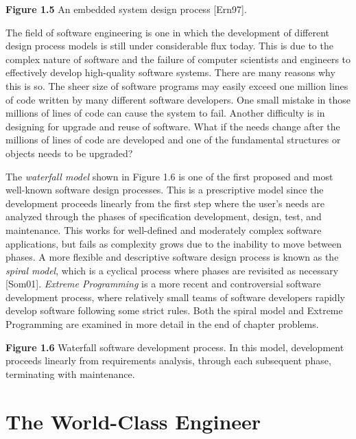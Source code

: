 \documentclass[a4paper,10pt]{book}
\begin{document}

\textbf{Figure 1.5} An embedded system design process {[}Ern97{]}.

The field of software engineering is one in which the development of
different design process models is still under considerable flux today.
This is due to the complex nature of software and the failure of
computer scientists and engineers to effectively develop high-quality
software systems. There are many reasons why this is so. The sheer size
of software programs may easily exceed one million lines of code written
by many different software developers. One small mistake in those
millions of lines of code can cause the system to fail. Another
difficulty is in designing for upgrade and reuse of software. What if
the needs change after the millions of lines of code are developed and
one of the fundamental structures or objects needs to be upgraded?

The \emph{waterfall model} shown in Figure 1.6 is one of the first
proposed and most well-known software design processes. This is a
prescriptive model since the development proceeds linearly from the
first step where the user's needs are analyzed through the phases of
specification development, design, test, and maintenance. This works for
well-defined and moderately complex software applications, but fails as
complexity grows due to the inability to move between phases. A more
flexible and descriptive software design process is known as the
\emph{spiral model}, which is a cyclical process where phases are
revisited as necessary {[}Som01{]}. \emph{Extreme Programming} is a more
recent and controversial software development process, where relatively
small teams of software developers rapidly develop software following
some strict rules. Both the spiral model and Extreme Programming are
examined in more detail in the end of chapter problems.


\textbf{Figure 1.6} Waterfall software development process. In this
model, development proceeds linearly from requirements analysis, through
each subsequent phase, terminating with maintenance.

\section{The World-Class Engineer}\label{the-world-class-engineer}
\end{document}

